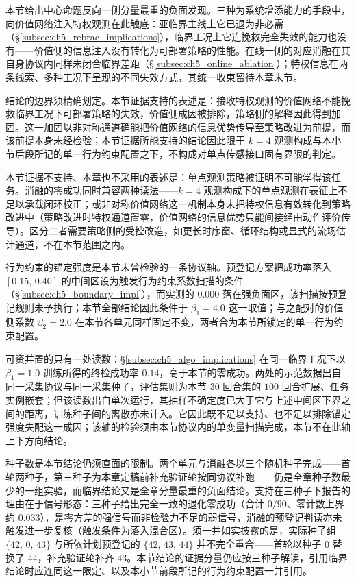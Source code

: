 本节给出中心命题反向一侧分量最重的负面发现。三种为系统增添能力的手段中，向价值网络注入特权观测在此触底：亚临界主线上它已退为非必需（\S\ref{subsec:ch5_rebrac_implications}），临界工况上它连挽救完全失效的能力也没有——价值侧的信息注入没有转化为可部署策略的性能。在线一侧的对应消融在其自身协议内同样未闭合临界差距（\S\ref{subsec:ch5_online_ablation}）；特权信息在两条线索、多种工况下呈现的不同失效方式，其统一收束留待本章末节。

结论的边界须精确划定。本节证据支持的表述是：接收特权观测的价值网络不能挽救临界工况下可部署策略的失效，价值侧成因被排除，策略侧的解释因此得到加固。这一加固以非对称通道确能把价值网络的信息优势传导至策略改进为前提，而该前提本身未经检验；本节证据所能支持的结论因此限于 $k=4$ 观测构成与本小节后段所记的单一行为约束配置之下，不构成对单点传感接口固有界限的判定。

本节证据不支持、本章也不采用的表述是：单点观测策略被证明不可能学得该任务。消融的零成功同时兼容两种读法——$k=4$ 观测构成下的单点观测在表征上不足以承载闭环校正；或非对称价值网络这一机制本身未把特权信息有效转化到策略改进中（策略改进时特权通道置零，价值网络的信息优势只能间接经由动作评价传导）。区分二者需要策略侧的受控改造，如更长时序窗、循环结构或显式的流场估计通道，不在本节范围之内。

行为约束的锚定强度是本节未曾检验的一条协议轴。预登记方案把成功率落入 $[0.15,\,0.40]$ 的中间区设为触发行为约束系数扫描的条件（\S\ref{subsec:ch5_boundary_impl}），而实测的 $0.000$ 落在强负面区，该扫描按预登记规则未予执行；本节全部结论因此条件于 $\beta_1=4.0$ 这一取值；与之配对的价值侧系数 $\beta_2=2.0$ 在本节各单元同样固定不变，两者合为本节所锁定的单一行为约束配置。

可资并置的只有一处读数：\S\ref{subsec:ch5_algo_implications} 在同一临界工况下以 $\beta_1=1.0$ 训练所得的终检成功率 $0.14$，高于本节的零成功。两处的示范数据出自同一采集协议与同一采集种子，评估集则为本节 $30$ 回合集的 $100$ 回合扩展、任务实例嵌套；但该读数出自单次运行，其抽样不确定度已大于它与上述中间区下界之间的距离，训练种子间的离散亦未计入。它因此既不足以支持、也不足以排除锚定强度失配这一成因；该轴的检验须由本节协议内的单变量扫描完成，本节不在此轴上下方向结论。

种子数是本节结论仍须直面的限制。两个单元与消融各以三个随机种子完成——首轮两种子，第三种子为本章定稿前补充验证轮按同协议补跑——仍是全章种子数最少的一组实验，而临界结论又是全章分量最重的负面结论。支持在三种子下报告的理由在于信号形态：三种子给出完全一致的退化零成功（合计 $0/90$、零计数上界约 $0.033$），是零方差的强信号而非检验力不足的弱信号，消融的预登记判读亦未触发进一步复核（触发条件为落入混合区）。须一并如实披露的是，实际种子组 $\{42,\,0,\,43\}$ 与所依计划预登记的 $\{42,\,43,\,44\}$ 并不完全重合——首轮以种子 $0$ 替换了 $44$，补充验证轮补齐 $43$。本节结论的证据分量仍应按三种子解读，引用临界结论时应连同这一限定、以及本小节前段所记的行为约束配置一并引用。

